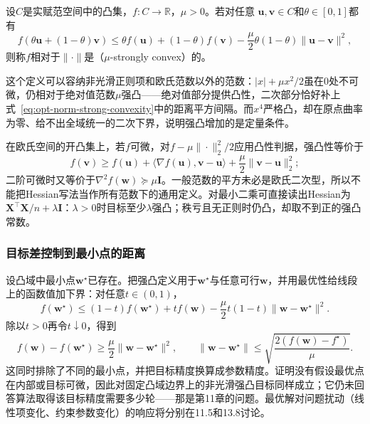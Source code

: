 \begin{definition}[相对于范数的强凸性]
\label{def:opt-strong-convexity}
设$C$是实赋范空间中的凸集，$f:C\to\mathbb{R}$，$\mu>0$。若对任意
$\bm{u},\bm{v}\in C$和$\theta\in[0,1]$都有
\begin{equation}
 f(\theta\bm{u}+(1-\theta)\bm{v})
 \leq\theta f(\bm{u})+(1-\theta)f(\bm{v})
 -\frac{\mu}{2}\theta(1-\theta)\lVert\bm{u}-\bm{v}\rVert^2,
 \label{eq:opt-norm-strong-convexity}
\end{equation}
则称$f$相对于$\lVert\cdot\rVert$是（$\mu$-strongly convex）的。
\end{definition}

这个定义可以容纳非光滑正则项和欧氏范数以外的范数：$|x|+\mu x^2/2$虽在$0$处不可微，仍相对于绝对值范数$\mu$强凸——绝对值部分提供凸性，二次部分恰好补上式~\eqref{eq:opt-norm-strong-convexity}中的距离平方间隔。而$x^4$严格凸，却在原点曲率为零、给不出全域统一的二次下界，说明强凸增加的是定量条件。

在欧氏空间的开凸集上，若$f$可微，对$f-\mu\|\cdot\|_2^2/2$应用凸性判据，强凸性等价于
\begin{equation}
  f(\bm{v})\geq f(\bm{u})+
  \langle\nabla f(\bm{u}),\bm{v}-\bm{u}\rangle
  +\frac{\mu}{2}\lVert\bm{v}-\bm{u}\rVert_2^2;
  \label{eq:opt-first-order-strong-convexity}
\end{equation}
二阶可微时又等价于$\nabla^2f(\bm w)\succeq\mu\bm I$。一般范数的平方未必是欧氏二次型，所以不能把Hessian写法当作所有范数下的通用定义。对最小二乘可直接读出Hessian为$\bm X^\top\bm X/n+\lambda\bm I$：$\lambda>0$时目标至少$\lambda$强凸；秩亏且无正则时仍凸，却取不到正的强凸常数。

\subsubsection{目标差控制到最小点的距离}

设凸域中最小点$\bm w^\star$已存在。把强凸定义用于$\bm w^\star$与任意可行$\bm w$，并用最优性给线段上的函数值加下界：对任意$t\in(0,1)$，
\[
 f(\bm w^\star)\leq(1-t)f(\bm w^\star)+tf(\bm w)
 -\frac{\mu}{2}t(1-t)\|\bm w-\bm w^\star\|^2.
\]
除以$t>0$再令$t\downarrow0$，得到
\begin{equation}
 f(\bm w)-f(\bm w^\star)\geq\frac{\mu}{2}\|\bm w-\bm w^\star\|^2,
 \qquad
 \|\bm w-\bm w^\star\|\leq\sqrt{\frac{2(f(\bm w)-f^\star)}{\mu}}.
 \label{eq:opt-strong-convex-distance}
\end{equation}
这同时排除了不同的最小点，并把目标精度换算成参数精度。证明没有假设最优点在内部或目标可微，因此对固定凸域边界上的非光滑强凸目标同样成立；它仍未回答算法取得该目标精度需要多少轮——那是第11章的问题。最优解对问题扰动（线性项变化、约束参数变化）的响应将分别在11.5和13.8讨论。

